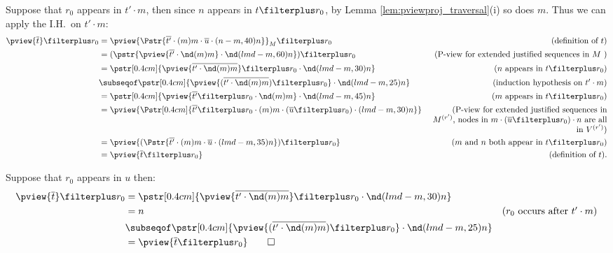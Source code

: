 \begin{itemize}
     Suppose that $r_0$ appears in $t' \cdot m$, then since $n$ appears in $t\filterplus r_0$, by Lemma \ref{lem:pviewproj_traversal}(i) so does $m$. Thus we can apply the I.H.\ on $t' \cdot m$:
     \begin{align*}
        \pview{\overline{t}} \filterplus r_0
        &= \pview{\Pstr{\overline{t'} \cdot (m){m} \cdot \overline{u} \cdot (n-m,40){n}}}_M \filterplus r_0
                & (\mbox{definition of } t)\\
        &= (\pstr{\pview{\overline{t'} \cdot \nd(m){m}}  \cdot \nd(lmd-m,60){n}}) \filterplus r_0
                & (\mbox{P-view for extended justified sequences in $M$ }) \\
        &= \pstr[0.4cm]{ \pview{\overline{t' \cdot \nd(m){m}}} \filterplus r_0  \cdot  \nd(lmd-m,30){n} }
                & (\mbox{$n$ appears in $t \filterplus r_0$}) \\
        &\subseqof \pstr[0.4cm]{ \pview{(\overline{t' \cdot \nd(m){m}} )\filterplus r_0} \cdot \nd(lmd-m,25){n} }
                & \mbox{(induction hypothesis on $t' \cdot m$)} \\
        &= \pstr[0.4cm]{ \pview{\overline{t'}\filterplus r_0 \cdot \nd(m){m}} \cdot \nd(lmd-m,45){n} }
                & \mbox{($m$ appears in $t \filterplus r_0$)} \\
        &= \pview{ \Pstr[0.4cm]{\overline{t'} \filterplus r_0 \cdot (m){m} \cdot {(\overline{u} \filterplus r_0)} \cdot (lmd-m,30){n}}}
                & \parbox[t]{7.5cm}{\raggedleft(P-view for extended justified sequences in $M^{(r')}$, nodes in $m\cdot (\overline{u} \filterplus r_0) \cdot n$ are all in $V^{(r')}$)} \\
        &= \pview{ (\Pstr{\overline{t'} \cdot (m){m} \cdot \overline{u} \cdot (lmd-m,35){n}}) \filterplus r_0 }
                & \mbox{($m$ and $n$ both appear in } t \filterplus r_0) \\
        &= \pview{ \overline{t} \filterplus r_0 }
                & \mbox{(definition of $t$).}
      \end{align*}

      Suppose that $r_0$ appears in $u$ then:
      \begin{align*}
        \pview{\overline{t}} \filterplus r_0
        &= \pstr[0.4cm]{ \pview{\overline{t' \cdot \nd(m){m}}}
           \filterplus r_0  \cdot  \nd(lmd-m,30){n} } \\
        &= n & (\mbox{$r_0$ occurs after $t'\cdot m$}) \\
            &\subseqof \pstr[0.4cm]{ \pview{(\overline{t' \cdot \nd(m){m}} )\filterplus r_0} \cdot \nd(lmd-m,25){n} }
                \\
        &= \pview{ \overline{t} \filterplus r_0 } \qed
      \end{align*}
\end{itemize}

